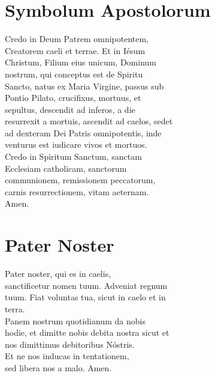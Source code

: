 \documentclass[paper=a5,pagesize=pdftex,fontsize=10pt,headinclude=on,twoside=off]{scrbook}
\begin{document}
\section{Symbolum Apostolorum}
\begin{scripture}
  \begin{poetry}
    Credo in Deum Patrem omnipotentem,\\
    Creatorem caeli et terrae. Et in Iésum\\
    Christum, Filium eius unicum, Dominum\\
    nostrum, qui conceptus est de Spiritu\\
    Sancto, natus ex Maria Virgine, passus sub\\
    Pontio Pilato, crucifixus, mortuus, et\\
    sepultus, descendit ad inferos, a die\\
    resurrexit a mortuis, ascendit ad caelos, sedet\\
    ad dexteram Dei Patris omnipotentis, inde\\
    venturus est iudicare vivos et mortuos.\\
    Credo in Spiritum Sanctum, sanctam\\
    Ecclesiam catholicam, sanctorum\\
    communionem, remissionem peccatorum,\\
    carnis resurrectionem, vitam aeternam.\\
    Amen.\\
  \end{poetry}
\end{scripture}

\section{Pater Noster}
\begin{scripture}
  \begin{poetry}
    Pater noster, qui es in caelis,\\
    sanctificetur nomen tuum. Adveniat regnum\\
    tuum. Fiat voluntas tua, sicut in caelo et in\\
    terra.\\
    Panem nostrum quotidianum da nobis\\
    hodie, et dimitte nobis debita nostra sicut et\\
    nos dimittimus debitoribus Nóstris.\\
    Et ne nos inducas in tentationem,\\
    sed libera nos a malo.
    Amen.\\
  \end{poetry}
\end{scripture}
\end{document}
